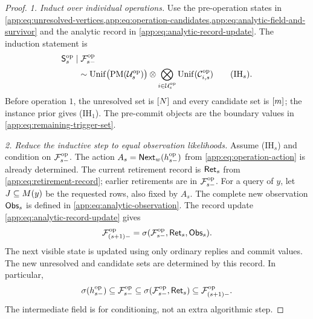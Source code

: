 \iffalse
\begin{proof}
\emph{1. Induct over individual operations.}
Use the pre-operation states in
\cref{app:eq:unresolved-vertices,app:eq:operation-candidates,app:eq:analytic-field-and-survivor}
and the analytic record in \cref{app:eq:analytic-record-update}.
The induction statement is
\begin{align*}
 &\mathsf S^{\mathrm{op}}_{s}\mid\mathcal F^{\mathrm{op}}_{s-}\\
 &\qquad\sim
 \operatorname{Unif}\bigl(\operatorname{PM}(\mathcal U^{\mathrm{op}}_{s})\bigr)
 \otimes\bigotimes_{i\in\mathcal U^{\mathrm{op}}_{s}}
       \operatorname{Unif}(\mathcal C^{\mathrm{op}}_{i,s})
 \qquad\text{(IH\(_s\))}.
\end{align*}
Before operation \(1\), the unresolved set is \([N]\) and every
candidate set is \([m]\); the instance prior gives (IH\(_1\)).
The pre-commit objects are the boundary values in
\cref{app:eq:remaining-trigger-set}.

\emph{2. Reduce the inductive step to equal observation likelihoods.}
Assume (IH\(_s\)) and condition on \(\mathcal F^{\mathrm{op}}_{s-}\).
The action \(A_s=\mathsf{Next}_w(h^{\mathrm{op}}_{s-})\) from
\cref{app:eq:operation-action} is already determined.
The current retirement record is \(\mathsf{Ret}_{s}\) from
\cref{app:eq:retirement-record}; earlier retirements are in \(\mathcal F^{\mathrm{op}}_{s-}\).
For a query of \(y\), let \(J\subseteq M(y)\) be the requested rows,
also fixed by \(A_s\). The complete new observation
\(\mathsf{Obs}_{s}\) is defined in \cref{app:eq:analytic-observation}.
The record update \cref{app:eq:analytic-record-update} gives
\[
 \mathcal F^{\mathrm{op}}_{(s+1)-}
 =\sigma(\mathcal F^{\mathrm{op}}_{s-},\mathsf{Ret}_{s},\mathsf{Obs}_{s}).
\]
The next visible state is updated using only ordinary replies and commit
values. The new unresolved and candidate sets are determined by this
record. In particular,
\[
 \sigma(h^{\mathrm{op}}_{s-})\subseteq\mathcal F^{\mathrm{op}}_{s-}
 \subseteq\sigma(\mathcal F^{\mathrm{op}}_{s-},\mathsf{Ret}_{s})
 \subseteq\mathcal F^{\mathrm{op}}_{(s+1)-}.
\]
The intermediate field is for conditioning, not an extra algorithmic step.




\end{proof}

